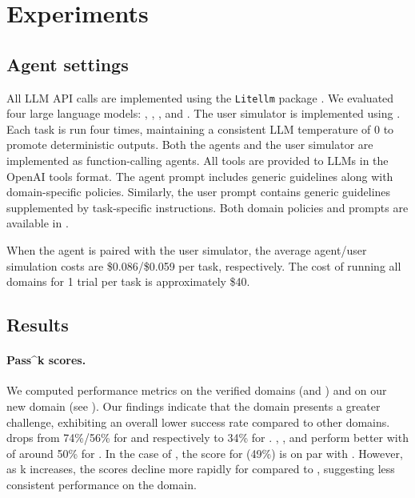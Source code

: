 \section{Experiments}
\label{sec:exps}

\subsection{Agent settings}
All LLM API calls are implemented using the \texttt{Litellm} package \cite{litellm}. 
We evaluated four large language models: \gptmini, \gptmodel, \ofourmodel, and \claudesonnet. 
The user simulator is implemented using \gptmodel.
Each task is run four times, maintaining a consistent LLM temperature of 0 to promote deterministic outputs.
Both the agents and the user simulator are implemented as function-calling agents. All tools are provided to LLMs in the OpenAI tools format.
The agent prompt includes generic guidelines along with domain-specific policies. Similarly, the user prompt contains generic guidelines supplemented by task-specific instructions. Both domain policies and prompts are available in .

When the \gptmodel agent is paired with the \gptmodel user simulator, the average agent/user simulation costs are \$0.086/\$0.059 per task, respectively.
The cost of running all domains for 1 trial per task is approximately \$40.

\subsection{Results}

\paragraph{Pass\textasciicircum k scores.}



We computed performance metrics on the verified \bench domains (\retail and \airline) and on our new \telecom domain (see ).
Our findings indicate that the \telecom domain presents a greater challenge, exhibiting an overall lower success rate compared to other domains. \gptmodelshort \passone drops from 74\%/56\% for \retail and \airline respectively to 34\% for \telecom.
\gptminishort, \ofourmodelshort, and \claudesonnetshort perform better with \passone of around 50\% for \telecom.
In the case of \claudesonnetshort, the \passone score for \telecom (49\%) is on par with \airline. However, as k increases, the \passk scores decline more rapidly for \telecom compared to \airline, suggesting less consistent performance on the \telecom domain.

